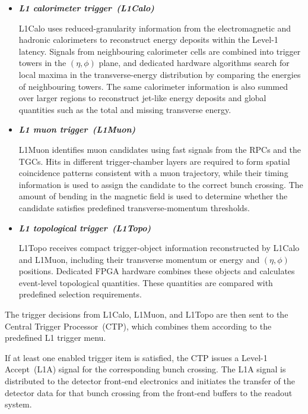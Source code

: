 \begin{itemize}
    \item \textbf{\textit{L1 calorimeter trigger~(L1Calo)}}
    \nopagebreak[4]

    L1Calo uses reduced-granularity information from the electromagnetic and hadronic calorimeters to reconstruct energy deposits within the Level-1 latency.
    Signals from neighbouring calorimeter cells are combined into trigger towers in the $(\eta,\phi)$ plane, and dedicated hardware algorithms search for local maxima in the transverse-energy distribution by comparing the energies of neighbouring towers.
    The same calorimeter information is also summed over larger regions to reconstruct jet-like energy deposits and global quantities such as the total and missing transverse energy.

    \item \textbf{\textit{L1 muon trigger~(L1Muon)}}
    \nopagebreak[4]

    L1Muon identifies muon candidates using fast signals from the RPCs and the TGCs. 
    Hits in different trigger-chamber layers are required to form spatial coincidence patterns consistent with a muon trajectory, while their timing information is used to assign the candidate to the correct bunch crossing.
    The amount of bending in the magnetic field is used to determine whether the candidate satisfies predefined transverse-momentum thresholds.

    \item \textbf{\textit{L1 topological trigger~(L1Topo)}}
    \nopagebreak[4]

    L1Topo receives compact trigger-object information reconstructed by L1Calo and L1Muon, including their transverse momentum or energy and $(\eta,\phi)$ positions.
    Dedicated FPGA hardware combines these objects and calculates event-level topological quantities.
    These quantities are compared with predefined selection requirements.
\end{itemize}

The trigger decisions from L1Calo, L1Muon, and L1Topo are then sent to the Central Trigger Processor~(CTP), which combines them according to the predefined L1 trigger menu.

If at least one enabled trigger item is satisfied, the CTP issues a Level-1 Accept~(L1A) signal for the corresponding bunch crossing.
The L1A signal is distributed to the detector front-end electronics and initiates the transfer of the detector data for that bunch crossing from the front-end buffers to the readout system.

